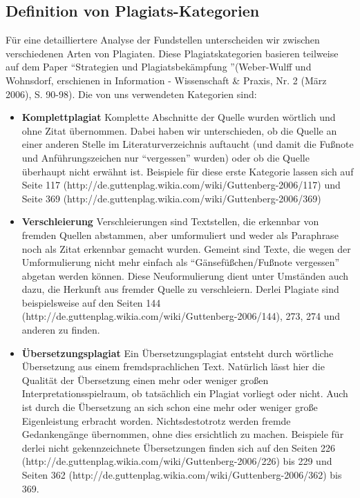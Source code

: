 \documentclass[ngerman,final,fontsize=12pt,paper=a4,twoside,BCOR=8mm,draft=false]{scrartcl}
\begin{document}
\subsection{Definition von Plagiats-Kategorien}
Für eine detailliertere Analyse der Fundstellen unterscheiden wir zwischen verschiedenen Arten von Plagiaten. Diese Plagiatskategorien basieren teilweise auf dem Paper \textquotedblleft Strategien und Plagiatsbekämpfung \textquotedblright (Weber-Wulff und Wohnsdorf, erschienen in Information - Wissenschaft \& Praxis, Nr. 2 (März 2006), S. 90-98).
Die von uns verwendeten Kategorien sind:
\begin{itemize}
\item \textbf{Komplettplagiat} 
Komplette Abschnitte der Quelle wurden wörtlich und ohne Zitat übernommen. Dabei haben wir unterschieden, ob die Quelle an einer anderen Stelle im Literaturverzeichnis auftaucht (und damit die Fußnote und Anführungszeichen nur "`vergessen"' wurden) oder ob die Quelle überhaupt nicht erwähnt ist. Beispiele für diese erste Kategorie lassen sich auf Seite 117 (http://de.guttenplag.wikia.com/wiki/Guttenberg-2006/117) und Seite 369 (http://de.guttenplag.wikia.com/wiki/Guttenberg-2006/369)

\item \textbf{Verschleierung} 
Verschleierungen sind Textstellen, die erkennbar von fremden Quellen abstammen, aber umformuliert und weder als Paraphrase noch als Zitat erkennbar gemacht wurden. Gemeint sind Texte, die wegen der Umformulierung nicht mehr einfach als "`Gänsefüßchen/Fußnote vergessen"' abgetan werden können. Diese Neuformulierung dient unter Umständen auch dazu, die Herkunft aus fremder Quelle zu verschleiern. Derlei Plagiate sind beispielsweise auf den Seiten 144 (http://de.guttenplag.wikia.com/wiki/Guttenberg-2006/144), 273, 274 und anderen zu finden.

\item \textbf{Übersetzungsplagiat} 
Ein Übersetzungsplagiat entsteht durch wörtliche Übersetzung aus einem fremdsprachlichen Text. Natürlich lässt hier die Qualität der Übersetzung einen mehr oder weniger großen Interpretationsspielraum, ob tatsächlich ein Plagiat vorliegt oder nicht. Auch ist durch die Übersetzung an sich schon eine mehr oder weniger große Eigenleistung erbracht worden. Nichtsdestotrotz werden fremde Gedankengänge übernommen, ohne dies ersichtlich zu machen. Beispiele für derlei nicht gekennzeichnete Übersetzungen finden sich auf den Seiten 226 (http://de.guttenplag.wikia.com/wiki/Guttenberg-2006/226) bis 229 und Seiten 362 (http://de.guttenplag.wikia.com/wiki/Guttenberg-2006/362) bis 369.


\end{itemize}
\end{document}
